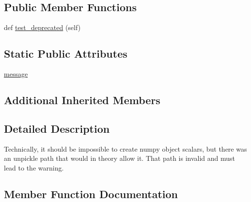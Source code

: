 \subsection*{Public Member Functions}
\begin{DoxyCompactItemize}
\item 
def \hyperlink{classnumpy_1_1core_1_1tests_1_1test__deprecations_1_1TestDeprecatedUnpickleObjectScalar_a97fd7b218e382559dd2a0443c30c17e0}{test\+\_\+deprecated} (self)
\end{DoxyCompactItemize}
\subsection*{Static Public Attributes}
\begin{DoxyCompactItemize}
\item 
\hyperlink{classnumpy_1_1core_1_1tests_1_1test__deprecations_1_1TestDeprecatedUnpickleObjectScalar_a5de721c377d7f6cb31cf2a4e2718a2f1}{message}
\end{DoxyCompactItemize}
\subsection*{Additional Inherited Members}


\subsection{Detailed Description}
\begin{DoxyVerb}Technically, it should be impossible to create numpy object scalars,
but there was an unpickle path that would in theory allow it. That
path is invalid and must lead to the warning.
\end{DoxyVerb}
 

\subsection{Member Function Documentation}
\mbox{\label{classnumpy_1_1core_1_1tests_1_1test__deprecations_1_1TestDeprecatedUnpickleObjectScalar_a97fd7b218e382559dd2a0443c30c17e0}} 
